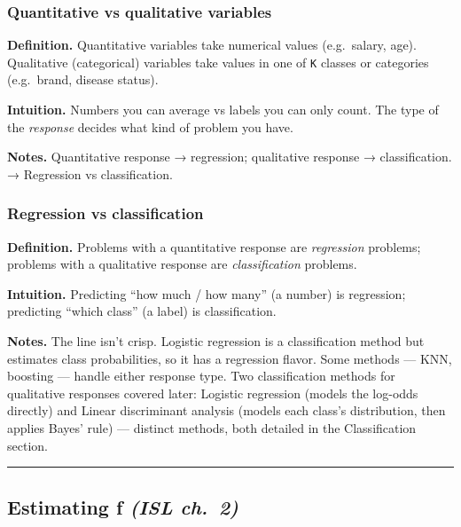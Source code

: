 \documentclass[
  10pt,
  letterpaper,
  onecolumn]{article}
\begin{document}
\hypertarget{quantitative-vs-qualitative-variables}{%
\subsubsection{Quantitative vs qualitative
variables}\label{quantitative-vs-qualitative-variables}}

\textbf{Definition.} Quantitative variables take numerical values
(e.g.~salary, age). Qualitative (categorical) variables take values in
one of \texttt{K} classes or categories (e.g.~brand, disease status).

\textbf{Intuition.} Numbers you can average vs labels you can only
count. The type of the \emph{response} decides what kind of problem you
have.

\textbf{Notes.} Quantitative response → regression; qualitative response
→ classification. → Regression vs classification.

\hypertarget{regression-vs-classification}{%
\subsubsection{Regression vs
classification}\label{regression-vs-classification}}

\textbf{Definition.} Problems with a quantitative response are
\emph{regression} problems; problems with a qualitative response are
\emph{classification} problems.

\textbf{Intuition.} Predicting ``how much / how many'' (a number) is
regression; predicting ``which class'' (a label) is classification.

\textbf{Notes.} The line isn't crisp. Logistic regression is a
classification method but estimates class probabilities, so it has a
regression flavor. Some methods --- KNN, boosting --- handle either
response type. Two classification methods for qualitative responses
covered later: Logistic regression (models the log-odds directly) and
Linear discriminant analysis (models each class's distribution, then
applies Bayes' rule) --- distinct methods, both detailed in the
Classification section.

\begin{center}\rule{0.5\linewidth}{0.5pt}\end{center}

\hypertarget{estimating-f-isl-ch.-2}{%
\subsection{\texorpdfstring{Estimating f \emph{(ISL
ch.~2)}}{Estimating f (ISL ch.~2)}}\label{estimating-f-isl-ch.-2}}
\end{document}
